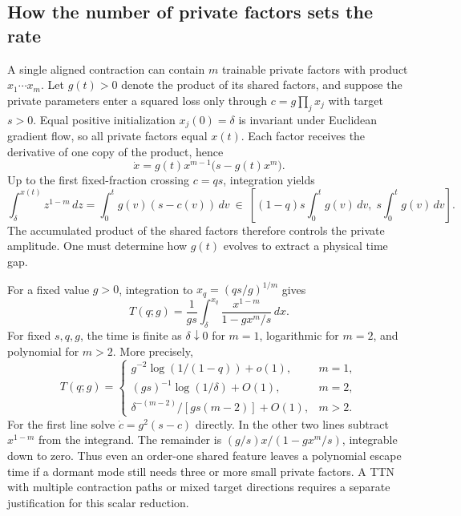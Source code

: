 \subsection{How the number of private factors sets the rate}
\label{sec:private-degree}
A single aligned contraction can contain \(m\) trainable private factors
with product \(x_1\cdots x_m\). Let \(g(t)>0\) denote the product of its
shared factors, and suppose the private parameters enter a squared loss only
through \(c=g\prod_j x_j\) with target \(s>0\). Equal positive initialization
\(x_j(0)=\delta\) is invariant under Euclidean gradient flow, so all
private factors equal \(x(t)\). Each factor receives the derivative of
one copy of the product, hence
\[
 \dot x=g(t)x^{m-1}\bigl(s-g(t)x^m\bigr).
\]
Up to the first fixed-fraction crossing \(c=q s\), integration yields
\[
 \int_\delta^{x(t)} z^{1-m}\,dz
   =\int_0^t g(v)(s-c(v))\,dv
   \ \in\
 \left[(1-q)s\int_0^t g(v)\,dv,\;
                   s\int_0^t g(v)\,dv\right].
\]
The accumulated product of the shared factors therefore controls the private
amplitude. One must determine how \(g(t)\) evolves to extract a physical
time gap.

For a fixed value \(g>0\), integration to \(x_q=(qs/g)^{1/m}\) gives
\[
 T(q;g)=\frac{1}{g s}
        \int_\delta^{x_q}\frac{x^{1-m}}{1-gx^m/s}\,dx .
\]
For fixed \(s,q,g\), the time is finite as \(\delta\downarrow0\) for \(m=1\),
logarithmic for \(m=2\), and polynomial for \(m>2\). More precisely,
\[
 T(q;g)=
 \begin{cases}
  g^{-2}\log(1/(1-q))+o(1), &m=1,\\
  (g s)^{-1}\log(1/\delta)+O(1), &m=2,\\
  \delta^{-(m-2)}/[g s(m-2)]+O(1), &m>2 .
 \end{cases}
\]
For the first line solve \(\dot c=g^2(s-c)\) directly. In the other two
lines subtract \(x^{1-m}\) from the integrand. The remainder is
\((g/s)x/(1-gx^m/s)\), integrable down to zero. Thus even an order-one
shared feature leaves a polynomial escape time if a dormant mode still
needs three or more small private factors. A TTN with multiple contraction
paths or mixed target directions requires a separate justification for this
scalar reduction.
